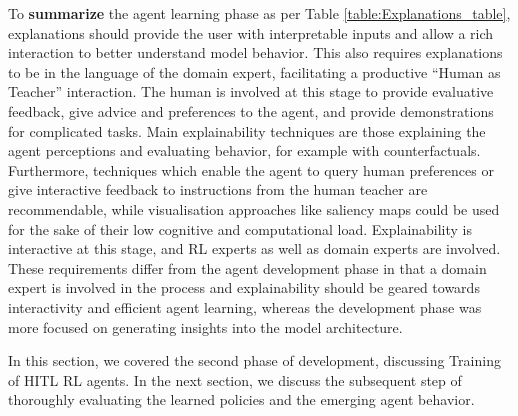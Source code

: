 \documentclass[twoside,11pt]{article}
\begin{document}
\begin{enumerate}
\noindent To \textbf{summarize} the agent learning phase as per Table \ref{table:Explanations_table}, explanations should provide the user with interpretable inputs and allow a rich interaction to better understand model behavior. This also requires explanations to be in the language of the domain expert, facilitating a productive ``Human as Teacher'' interaction. The human is involved at this stage to provide evaluative feedback, give advice and preferences to the agent, and provide demonstrations for complicated tasks. Main explainability techniques are those explaining the agent perceptions and evaluating behavior, for example with counterfactuals. Furthermore, techniques which enable the agent to query human preferences or give interactive feedback to instructions from the human teacher are recommendable, while visualisation approaches like saliency maps could be used for the sake of their low cognitive and computational load. Explainability is interactive at this stage, and RL experts as well as domain experts are involved. These requirements differ from the agent development phase in that a domain expert is involved in the process and explainability should be geared towards interactivity and efficient agent learning, whereas the development phase was more focused on generating insights into the model architecture.

In this section, we covered the second phase of development, discussing Training of HITL RL agents. In the next section, we discuss the subsequent step of thoroughly evaluating the learned policies and the emerging agent behavior. 


\end{enumerate}
\end{document}
